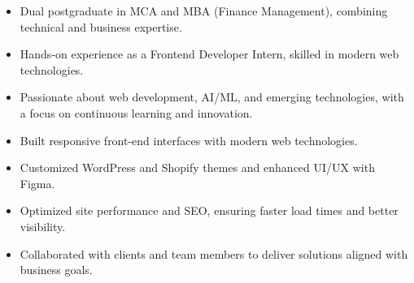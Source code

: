 \documentclass[10pt,a4paper,ragged2e]{altacv}
\begin{document}
\tagline{}

\begin{fullwidth}
\makecvheader
\end{fullwidth}


\begin{itemize}
\item Dual postgraduate in MCA and MBA (Finance Management), combining technical and business expertise.
\smallskip
\item Hands-on experience as a Frontend Developer Intern, skilled in modern web technologies.
\smallskip
\item Passionate about web development, AI/ML, and emerging technologies, with a focus on continuous learning and innovation.
 \end{itemize}
\smallskip


\begin{itemize}
\item Built responsive front-end interfaces with modern web technologies.
\smallskip
\item Customized WordPress and Shopify themes and enhanced UI/UX with Figma.
\smallskip
\item Optimized site performance and SEO, ensuring faster load times and better visibility. 
\smallskip
\item Collaborated with clients and team members to deliver solutions aligned with business goals.
\end{itemize}
\smallskip

\end{document}
